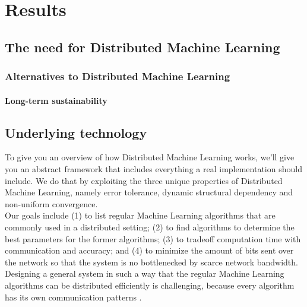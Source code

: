 \section{Results}

\subsection{The need for Distributed Machine Learning}
\subsubsection{Alternatives to Distributed Machine Learning}
\paragraph{Long-term sustainability}










\subsection{Underlying technology}
To give you an overview of how Distributed Machine Learning works, we'll give you an abstract framework that includes everything a real implementation should include. We do that by exploiting the three unique properties of Distributed Machine Learning, namely error tolerance, dynamic structural dependency and non-uniform convergence.\cite{Xing16}\\
Our goals include (1) to list regular Machine Learning algorithms that are commonly used in a distributed setting; (2) to find algorithms to determine the best parameters for the former algorithms; (3) to tradeoff computation time with communication and accuracy; and (4) to minimize the amount of bits sent over the network so that the system is no bottlenecked by scarce network bandwidth.\\
Designing a general system in such a way that the regular Machine Learning algorithms can be distributed efficiently is challenging, because every algorithm has its own communication patterns \cite{Jia14}\cite{Newman09}\cite{Rich13}\cite{Smola10}\cite{Takac13}\cite{Tsi12}.

